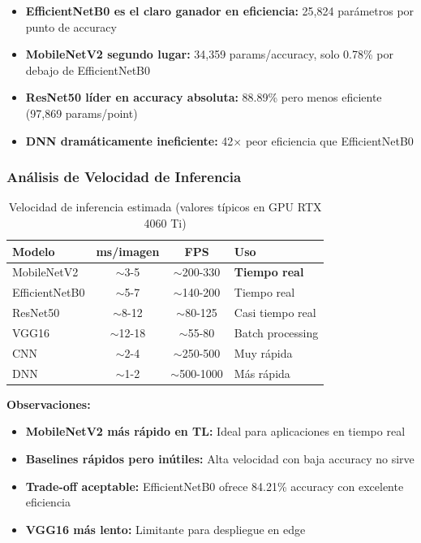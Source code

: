 \documentclass[11pt, a4paper]{article}
\begin{document}
\begin{itemize}
    \item \textbf{EfficientNetB0 es el claro ganador en eficiencia:} 25,824 parámetros por punto de accuracy
    \item \textbf{MobileNetV2 segundo lugar:} 34,359 params/accuracy, solo 0.78\% por debajo de EfficientNetB0
    \item \textbf{ResNet50 líder en accuracy absoluta:} 88.89\% pero menos eficiente (97,869 params/point)
    \item \textbf{DNN dramáticamente ineficiente:} 42× peor eficiencia que EfficientNetB0
\end{itemize}

\subsubsection{Análisis de Velocidad de Inferencia}

\begin{table}[H]
\centering
\caption{Velocidad de inferencia estimada (valores típicos en GPU RTX 4060 Ti)}
\label{tab:inference_speed}
\begin{tabular}{@{}lccl@{}}
\toprule
\textbf{Modelo} & \textbf{ms/imagen} & \textbf{FPS} & \textbf{Uso} \\
\midrule
MobileNetV2    & $\sim$3-5   & $\sim$200-330  & \textbf{Tiempo real} \\
EfficientNetB0 & $\sim$5-7   & $\sim$140-200  & Tiempo real \\
ResNet50       & $\sim$8-12  & $\sim$80-125   & Casi tiempo real \\
VGG16          & $\sim$12-18 & $\sim$55-80    & Batch processing \\
CNN            & $\sim$2-4   & $\sim$250-500  & Muy rápida \\
DNN            & $\sim$1-2   & $\sim$500-1000 & Más rápida \\
\bottomrule
\end{tabular}
\end{table}

\textbf{Observaciones:}

\begin{itemize}
    \item \textbf{MobileNetV2 más rápido en TL:} Ideal para aplicaciones en tiempo real
    \item \textbf{Baselines rápidos pero inútiles:} Alta velocidad con baja accuracy no sirve
    \item \textbf{Trade-off aceptable:} EfficientNetB0 ofrece 84.21\% accuracy con excelente eficiencia
    \item \textbf{VGG16 más lento:} Limitante para despliegue en edge
\end{itemize}
\end{document}
